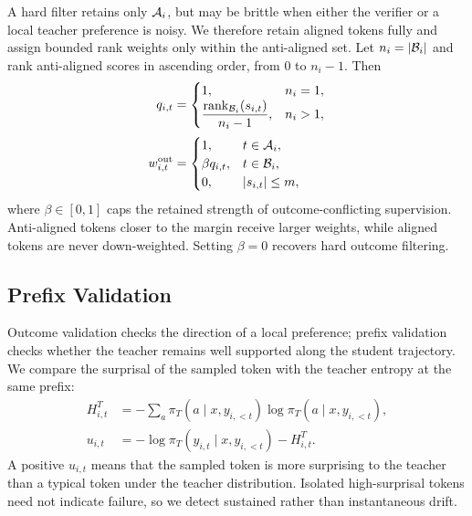 A hard filter retains only ${\cal A}_i$, but may be brittle when either the verifier or a local teacher preference is noisy. We therefore retain aligned tokens fully and assign bounded rank weights only within the anti-aligned set. Let $n_i=|{\cal B}_i|$ and rank anti-aligned scores in ascending order, from $0$ to $n_i-1$. Then
\begin{equation}
\begin{aligned}
q_{i,t}&=
\begin{cases}
1, & n_i=1,\\
\dfrac{\operatorname{rank}_{{\cal B}_i}(s_{i,t})}{n_i-1}, & n_i>1,
\end{cases}\\[2pt]
w^{\mathrm{out}}_{i,t}&=
\begin{cases}
1, & t\in{\cal A}_i,\\
\beta q_{i,t}, & t\in{\cal B}_i,\\
0, & |s_{i,t}|\leq m,
\end{cases}
\end{aligned}
\label{eq:outcome-validation}
\end{equation}
where $\beta\in[0,1]$ caps the retained strength of outcome-conflicting supervision. Anti-aligned tokens closer to the margin receive larger weights, while aligned tokens are never down-weighted. Setting $\beta=0$ recovers hard outcome filtering.

\subsection{Prefix Validation}

Outcome validation checks the direction of a local preference; prefix validation checks whether the teacher remains well supported along the student trajectory. We compare the surprisal of the sampled token with the teacher entropy at the same prefix:
\begin{equation}
\begin{aligned}
H^T_{i,t}&=-\sum_a\pi_T(a\mid x,y_{i,<t})
\log\pi_T(a\mid x,y_{i,<t}),\\
u_{i,t}&=-\log\pi_T(y_{i,t}\mid x,y_{i,<t})-H^T_{i,t}.
\end{aligned}
\label{eq:excess-surprisal}
\end{equation}
A positive $u_{i,t}$ means that the sampled token is more surprising to the teacher than a typical token under the teacher distribution. Isolated high-surprisal tokens need not indicate failure, so we detect sustained rather than instantaneous drift.


